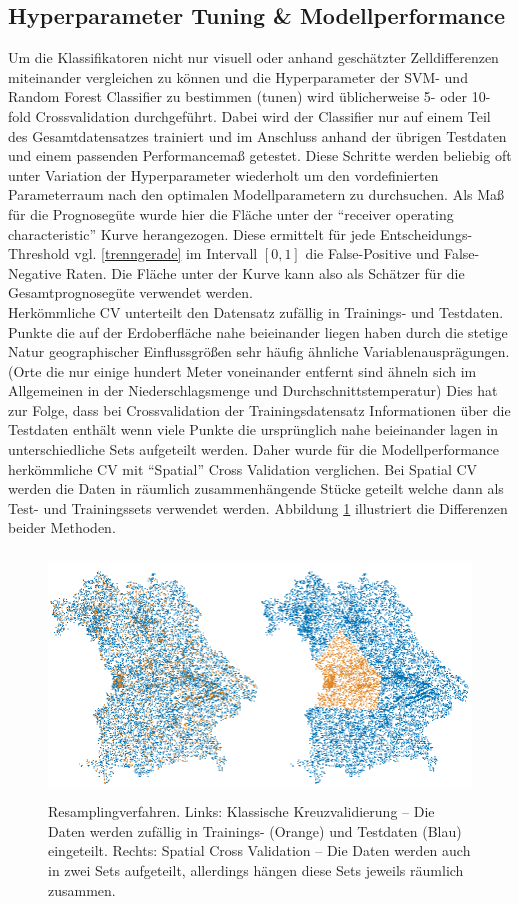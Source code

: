 \subsection{Hyperparameter Tuning \& Modellperformance}

Um die Klassifikatoren nicht nur visuell oder anhand geschätzter Zelldifferenzen miteinander vergleichen zu können und die Hyperparameter der SVM- und Random Forest Classifier zu bestimmen (tunen) wird üblicherweise 5- oder 10-fold Crossvalidation durchgeführt. Dabei wird der Classifier nur auf einem Teil des Gesamtdatensatzes trainiert und im Anschluss anhand der übrigen Testdaten und einem passenden Performancemaß getestet. Diese Schritte werden beliebig oft unter Variation der Hyperparameter wiederholt um den vordefinierten Parameterraum nach den optimalen Modellparametern zu durchsuchen. Als Maß für die Prognosegüte wurde hier die Fläche unter der ``receiver operating characteristic'' Kurve herangezogen. Diese ermittelt für jede Entscheidungs-Threshold vgl. \ref{trenngerade} im Intervall $[0,1]$ die False-Positive und False-Negative Raten. Die Fläche unter der Kurve kann also als Schätzer für die Gesamtprognosegüte verwendet werden. \\
Herkömmliche CV unterteilt den Datensatz zufällig in Trainings- und Testdaten. Punkte die auf der Erdoberfläche nahe beieinander liegen haben durch die stetige Natur geographischer Einflussgrößen sehr häufig ähnliche Variablenausprägungen. (Orte die nur einige hundert Meter voneinander entfernt sind ähneln sich im Allgemeinen in der Niederschlagsmenge und Durchschnittstemperatur) Dies hat zur Folge, dass bei Crossvalidation der Trainingsdatensatz Informationen über die Testdaten enthält wenn viele Punkte die ursprünglich nahe beieinander lagen in unterschiedliche Sets aufgeteilt werden. Daher wurde für die Modellperformance herkömmliche CV mit ``Spatial'' Cross Validation verglichen. Bei Spatial CV werden die Daten in räumlich zusammenhängende Stücke geteilt welche dann als Test- und Trainingssets verwendet werden. Abbildung \ref{resamplingviz} illustriert die Differenzen beider Methoden. 
\begin{figure}[H]
    \centering
    \includegraphics[width = 15cm, height = 6.5cm]{Figures/resampling.png}
    \caption{Resamplingverfahren. Links: Klassische Kreuzvalidierung -- Die Daten werden zufällig in Trainings- (Orange) und Testdaten (Blau) eingeteilt. Rechts: Spatial Cross Validation -- Die Daten werden auch in zwei Sets aufgeteilt, allerdings hängen diese Sets jeweils räumlich zusammen.}
    \label{resamplingviz}
\end{figure}
